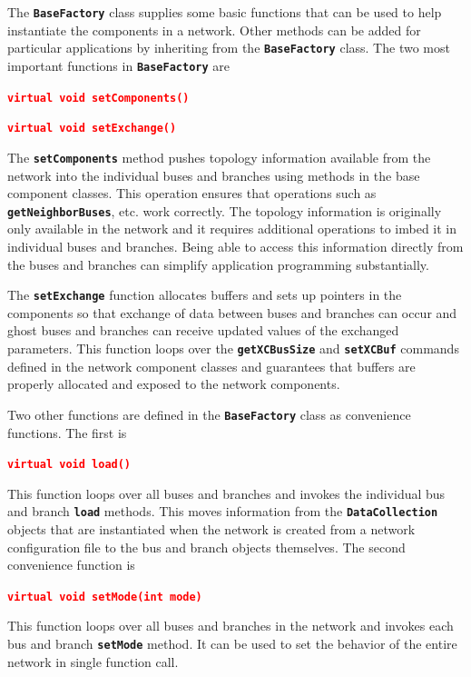 \documentclass[12pt]{report} %
\begin{document}
The \texttt{\textbf{BaseFactory}} class supplies some basic functions that can be used to help instantiate the components in a network. Other methods can be added for particular applications by inheriting from the \texttt{\textbf{BaseFactory}} class. The two most important functions in \texttt{\textbf{BaseFactory}} are

\textcolor{red}{\texttt{\textbf{virtual void setComponents()}}}


\textcolor{red}{\texttt{\textbf{virtual void setExchange()}}}

The \texttt{\textbf{setComponents}} method pushes topology information available from the network into the individual buses and branches using methods in the base component classes. This operation ensures that operations such as \texttt{\textbf{getNeighborBuses}}, etc. work correctly. The topology information is originally only available in the network and it requires additional operations to imbed it in individual buses and branches. Being able to access this information directly from the buses and branches can simplify application programming substantially.

The \texttt{\textbf{setExchange}} function allocates buffers and sets up pointers in the components so that exchange of data between buses and branches can occur and ghost buses and branches can receive updated values of the exchanged parameters. This function loops over the \texttt{\textbf{getXCBusSize}} and \texttt{\textbf{setXCBuf}} commands defined in the network component classes and guarantees that buffers are properly allocated and exposed to the network components.

Two other functions are defined in the \texttt{\textbf{BaseFactory}} class as convenience functions. The first is

\textcolor{red}{\texttt{\textbf{virtual void load()}}}

This function loops over all buses and branches and invokes the individual bus and branch \texttt{\textbf{load}} methods. This moves information from the \texttt{\textbf{DataCollection}} objects that are instantiated when the network is created from a network configuration file to the bus and branch objects themselves. The second convenience function is

\textcolor{red}{\texttt{\textbf{virtual void setMode(int mode)}}}

This function loops over all buses and branches in the network and invokes each bus and branch \texttt{\textbf{setMode}} method. It can be used to set the behavior of the entire network in single function call.
\end{document}
